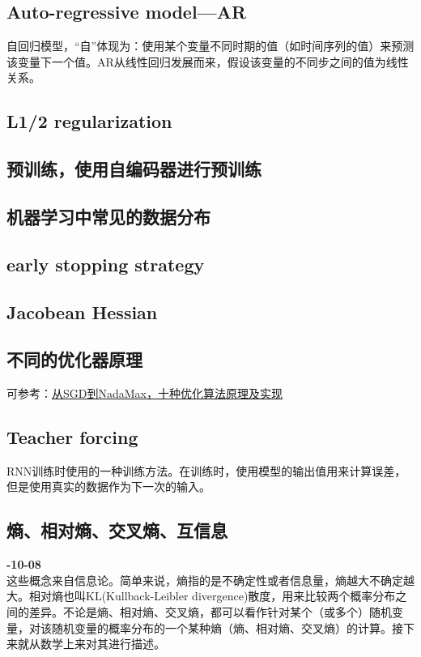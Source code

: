 \subsection{Auto-regressive model---AR}
自回归模型，“自”体现为：使用某个变量不同时期的值（如时间序列的值）来预测该变量下一个值。AR从线性回归发展而来，假设该变量的不同步之间的值为线性关系。


\subsection{L1/2 regularization}


\subsection{预训练，使用自编码器进行预训练}

\subsection{机器学习中常见的数据分布}

\subsection{early stopping strategy}

\subsection{Jacobean Hessian}


\subsection{不同的优化器原理}
可参考：\href{https://mp.weixin.qq.com/s/L9jCK5rtyq3fJZEBpLvagg}{从SGD到NadaMax，十种优化算法原理及实现}


\subsection{Teacher forcing}     
RNN训练时使用的一种训练方法。在训练时，使用模型的输出值用来计算误差，但是使用真实的数据作为下一次的输入。


\subsection{熵、相对熵、交叉熵、互信息} 
\textbf{-10-08}\\
这些概念来自信息论\cite{6773024}。简单来说，熵指的是不确定性或者信息量，熵越大不确定越大。相对熵也叫KL(Kullback-Leibler divergence)散度，用来比较两个概率分布之间的差异。不论是熵、相对熵、交叉熵，都可以看作针对某个（或多个）随机变量，对该随机变量的概率分布的一个某种熵（熵、相对熵、交叉熵）的计算。接下来就从数学上来对其进行描述。

